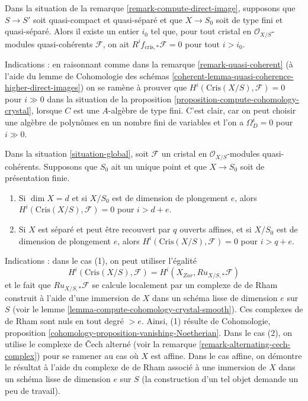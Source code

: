 \begin{remark}[Bornitude]
\label{remark-bounded-cohomology}
Dans la situation de la remarque \ref{remark-compute-direct-image},
supposons que $S \to S'$ soit quasi-compact et quasi-séparé et
que $X \to S_0$ soit de type fini et quasi-séparé. Alors il existe
un entier $i_0$ tel que, pour tout cristal
en $\mathcal{O}_{X/S}$-modules quasi-cohérents $\mathcal{F}$,
on ait $R^if_{\text{cris}, *}\mathcal{F} = 0$ pour tout $i > i_0$.

\medskip\noindent
Indications : en raisonnant comme dans la remarque \ref{remark-quasi-coherent} (à l'aide du
lemme de Cohomologie des schémas
\ref{coherent-lemma-quasi-coherence-higher-direct-images})
on se ramène à prouver que $H^i(\text{Cris}(X/S), \mathcal{F}) = 0$ pour $i \gg 0$
dans la situation de la proposition \ref{proposition-compute-cohomology-crystal},
lorsque $C$ est une $A$-algèbre de type fini. C'est clair, car on peut
choisir une algèbre de polynômes en un nombre fini de variables et l'on a $\Omega^i_D = 0$
pour $i \gg 0$.
\end{remark}

\begin{remark}
\label{remark-bounded-cohomology-over-point}
Dans la situation \ref{situation-global}, soit $\mathcal{F}$ un cristal en
$\mathcal{O}_{X/S}$-modules quasi-cohérents. Supposons que $S_0$
ait un unique point et que $X \to S_0$ soit de présentation finie.
\begin{enumerate}
\item Si $\dim X = d$ et si $X/S_0$ est de dimension de plongement $e$, alors
$H^i(\text{Cris}(X/S), \mathcal{F}) = 0$ pour $i > d + e$.
\item Si $X$ est séparé et peut être recouvert par $q$ ouverts affines, et si
$X/S_0$ est de dimension de plongement $e$, alors
$H^i(\text{Cris}(X/S), \mathcal{F}) = 0$ pour $i > q + e$.
\end{enumerate}
Indications : dans le cas (1), on peut utiliser l'égalité
$$
H^i(\text{Cris}(X/S), \mathcal{F}) = H^i(X_{Zar}, Ru_{X/S, *}\mathcal{F})
$$
et le fait que $Ru_{X/S, *}\mathcal{F}$ se calcule localement par un complexe de de Rham
construit à l'aide d'une immersion de $X$ dans un schéma lisse
de dimension $e$ sur $S$
(voir le lemme \ref{lemma-compute-cohomology-crystal-smooth}).
Ces complexes de de Rham sont nuls en tout degré $> e$. Ainsi, (1)
résulte de Cohomologie, proposition
\ref{cohomology-proposition-vanishing-Noetherian}.
Dans le cas (2), on utilise le complexe de {\v C}ech alterné (voir la
remarque \ref{remark-alternating-cech-complex}) pour se ramener au cas où
$X$ est affine. Dans le cas affine, on démontre le résultat à l'aide du complexe de de Rham
associé à une immersion de $X$ dans un schéma lisse de dimension $e$
sur $S$ (la construction d'un tel objet demande un peu de travail).
\end{remark}

